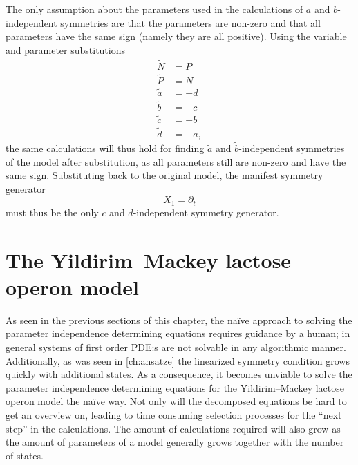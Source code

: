The only assumption about the parameters used in the calculations of \(a\) and \(b\)-independent symmetries are that the parameters are non-zero and that all parameters have the same sign (namely they are all positive).
Using the variable and parameter substitutions
\begin{align}
  \tilde{N} &= P \\
  \tilde{P} &= N \\
  \tilde{a} &= -d \\
  \tilde{b} &= -c \\
  \tilde{c} &= -b \\
  \tilde{d} &= -a,
\end{align}
the same calculations will thus hold for finding \(\tilde{a}\) and \(\tilde{b}\)-independent symmetries of the model after substitution, as all parameters still are non-zero and have the same sign.
Substituting back to the original model, the manifest symmetry generator
\begin{equation}
  X_1 = \partial_t
\end{equation}
must thus be the only \(c\) and \(d\)-independent symmetry generator.

\section{The Yildirim--Mackey lactose operon model}

As seen in the previous sections of this chapter, the naïve approach to solving the parameter independence determining equations requires guidance by a human; in general systems of first order PDE:s are not solvable in any algorithmic manner.
Additionally, as was seen in \cref{ch:ansatze} the linearized symmetry condition grows quickly with additional states.
As a consequence, it becomes unviable to solve the parameter independence determining equations for the Yildirim--Mackey lactose operon model the naïve way.
Not only will the decomposed equations be hard to get an overview on, leading to time consuming selection processes for the \enquote{next step} in the calculations.
The amount of calculations required will also grow as the amount of parameters of a model generally grows together with the number of states.

